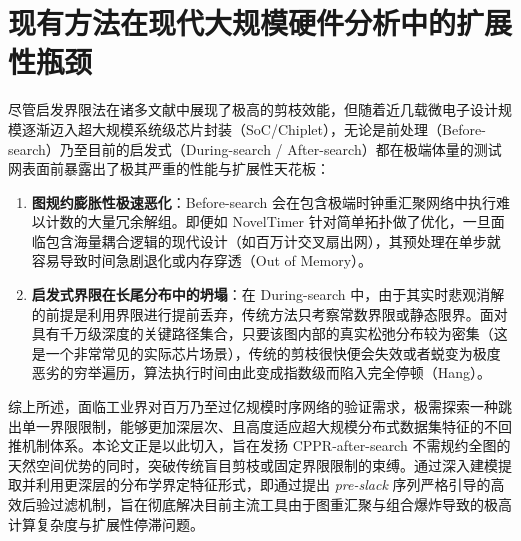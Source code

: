 \section{现有方法在现代大规模硬件分析中的扩展性瓶颈}
\label{sec:scalability_bottleneck}

尽管启发界限法在诸多文献中展现了极高的剪枝效能，但随着近几载微电子设计规模逐渐迈入超大规模系统级芯片封装（SoC/Chiplet），无论是前处理（Before-search）乃至目前的启发式（During-search / After-search）都在极端体量的测试网表面前暴露出了极其严重的性能与扩展性天花板：

\begin{enumerate}
    \item \textbf{图规约膨胀性极速恶化}：Before-search 会在包含极端时钟重汇聚网络中执行难以计数的大量冗余解组。即便如 NovelTimer 针对简单拓扑做了优化，一旦面临包含海量耦合逻辑的现代设计（如百万计交叉扇出网），其预处理在单步就容易导致时间急剧退化或内存穿透（Out of Memory）。
    \item \textbf{启发式界限在长尾分布中的坍塌}：在 During-search 中，由于其实时悲观消解的前提是利用界限进行提前丢弃，传统方法只考察常数界限或静态限界。面对具有千万级深度的关键路径集合，只要该图内部的真实松弛分布较为密集（这是一个非常常见的实际芯片场景），传统的剪枝很快便会失效或者蜕变为极度恶劣的穷举遍历，算法执行时间由此变成指数级而陷入完全停顿（Hang）。
\end{enumerate}

综上所述，面临工业界对百万乃至过亿规模时序网络的验证需求，极需探索一种跳出单一界限限制，能够更加深层次、且高度适应超大规模分布式数据集特征的不回推机制体系。本论文正是以此切入，旨在发扬 CPPR-after-search 不需规约全图的天然空间优势的同时，突破传统盲目剪枝或固定界限限制的束缚。通过深入建模提取并利用更深层的分布学界定特征形式，即通过提出 \textit{pre-slack} 序列严格引导的高效后验过滤机制，旨在彻底解决目前主流工具由于图重汇聚与组合爆炸导致的极高计算复杂度与扩展性停滞问题。
